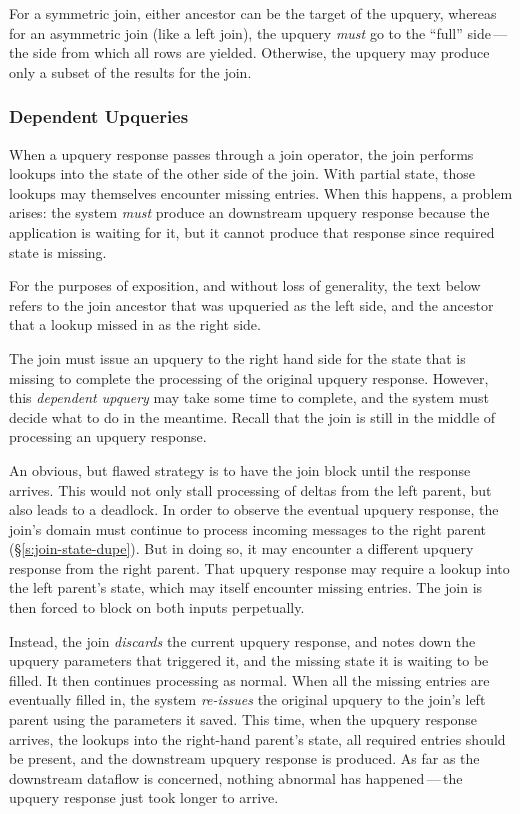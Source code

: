 For a symmetric join, either ancestor can be the target of the upquery, whereas
for an asymmetric join (like a left join), the upquery \emph{must} go to the
``full'' side\,---\,the side from which all rows are yielded. Otherwise, the
upquery may produce only a subset of the results for the join.

\subsubsection{Dependent Upqueries}

When a upquery response passes through a join operator, the join performs
lookups into the state of the other side of the join. With partial state, those
lookups may themselves encounter missing entries. When this happens, a problem
arises: the system \emph{must} produce an downstream upquery response because
the application is waiting for it, but it cannot produce that response since
required state is missing.

For the purposes of exposition, and without loss of generality, the text below
refers to the join ancestor that was upqueried as the left side, and the
ancestor that a lookup missed in as the right side.

The join must issue an upquery to the right hand side for the state that is
missing to complete the processing of the original upquery response. However,
this \textit{dependent upquery} may take some time to complete, and the system
must decide what to do in the meantime. Recall that the join is still in the
middle of processing an upquery response.

An obvious, but flawed strategy is to have the join block until the response
arrives. This would not only stall processing of deltas from the left parent,
but also leads to a deadlock. In order to observe the eventual upquery response,
the join's domain must continue to process incoming messages to the right parent
(\S\ref{s:join-state-dupe}). But in doing so, it may encounter a different
upquery response from the right parent. That upquery response may require a
lookup into the left parent's state, which may itself encounter missing entries.
The join is then forced to block on both inputs perpetually.

Instead, the join \emph{discards} the current upquery response, and notes down
the upquery parameters that triggered it, and the missing state it is waiting to
be filled. It then continues processing as normal. When all the missing entries
are eventually filled in, the system \emph{re-issues} the original upquery to
the join's left parent using the parameters it saved. This time, when the
upquery response arrives, the lookups into the right-hand parent's state, all
required entries should be present, and the downstream upquery response is
produced. As far as the downstream dataflow is concerned, nothing abnormal has
happened\,---\,the upquery response just took longer to arrive.

